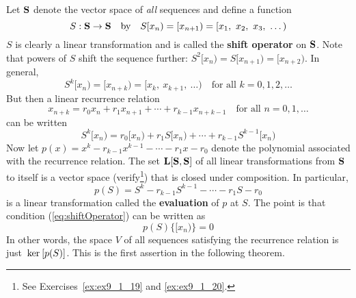Let $\textbf{S}$ denote the vector space of \textit{all} sequences and define a function
\begin{equation*}
S : \vectspace{S} \to \vectspace{S} \quad \mbox{by} \quad S[x_n) = [x_{n+1}) = [x_1, \ x_2, \ x_3, \ \dots)
\end{equation*}
$S$ is clearly a linear transformation and is called the \textbf{shift operator} on $\textbf{S}$. Note that powers of $S$ shift the sequence further: $S^{2}[x_{n}) = S[x_{n+1}) = [x_{n+2})$. In general,
\begin{equation*}
S^k[x_n) = [x_{n+k}) = [x_k, \ x_{k+1}, \ \dots) \quad \mbox{for all } k = 0, 1, 2, \dots
\end{equation*}
But then a linear recurrence relation
\begin{equation*}
x_{n+k} = r_0x_n + r_1x_{n+1} + \cdots + r_{k-1}x_{n+k-1} \quad \mbox{for all } n = 0, 1, \dots
\end{equation*}
can be written
\begin{equation}\label{eq:shiftOperator}
S^k[x_n) = r_0[x_n) + r_1S[x_n) + \cdots + r_{k-1}S^{k-1}[x_n)
\end{equation}
Now let $p(x) = x^{k} - r_{k-1}x^{k-1} - \cdots - r_{1}x - r_{0}$ denote the polynomial associated with the recurrence relation. The set $\textbf{L}[\textbf{S}, \textbf{S}]$ of all linear transformations from $\textbf{S}$ to itself is a vector space (verify\footnote{See Exercises~\ref{ex:ex9_1_19} and \ref{ex:ex9_1_20}.}) that is closed under composition. In particular,
\begin{equation*}
p(S) = S^k - r_{k-1}S^{k-1} - \cdots - r_1S - r_0
\end{equation*}
is a linear transformation called the \textbf{evaluation} of $p$ at $S$. The point is that condition (\ref{eq:shiftOperator}) can be written as
\begin{equation*}
p(S)\{[x_n)\} = 0
\end{equation*}
In other words, the space $V$ of all sequences satisfying the recurrence relation is just $\thinspace\operatorname{ker\medspace}[p(S)]$. This is the first assertion in the following theorem.

